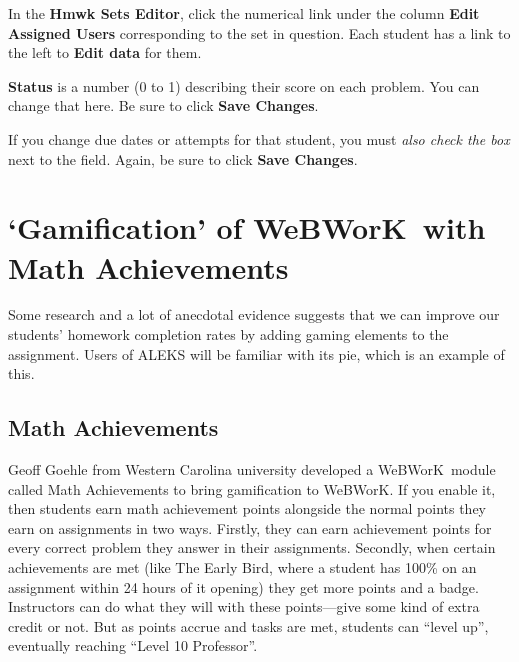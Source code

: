 \documentclass[12pt]{article}
\newcommand{\menu}[1]{\textbf{#1}}
\newcommand{\WW}{WeBWorK}
\newcommand{\HSE}{\menu{Hmwk Sets Editor}}
\begin{document}
In the \HSE, click the numerical link under the column \menu{Edit Assigned Users} corresponding to the set in question.  Each student has a link to the left to \menu{Edit data} for them.

\menu{Status} is a number (0 to 1) describing their score on each problem.  You can change that here.  Be sure to click \menu{Save Changes}.

If you change due dates or attempts for that student, you must \emph{also check the box} next to the field.  Again, be sure to click \menu{Save Changes}.

\section{`Gamification' of \WW\ with Math Achievements}\label{gamification}

Some research and a lot of anecdotal evidence suggests that we can improve our students' homework completion rates by adding gaming elements to the assignment. Users of ALEKS will be familiar with its pie, which is an example of this.

\subsection{Math Achievements}

Geoff Goehle from Western Carolina university developed a \WW\ module called Math Achievements to bring gamification to \WW. If you enable it, then students earn math achievement points alongside the normal points they earn on assignments in two ways. Firstly, they can earn achievement points for every correct problem they answer in their assignments. Secondly, when certain achievements are met (like The Early Bird, where a student has 100\% on an assignment within 24 hours of it opening) they get more points and a badge. Instructors can do what they will with these points---give some kind of extra credit or not. But as points accrue and tasks are met, students can ``level up'', eventually reaching ``Level 10 Professor''. 
\end{document}
